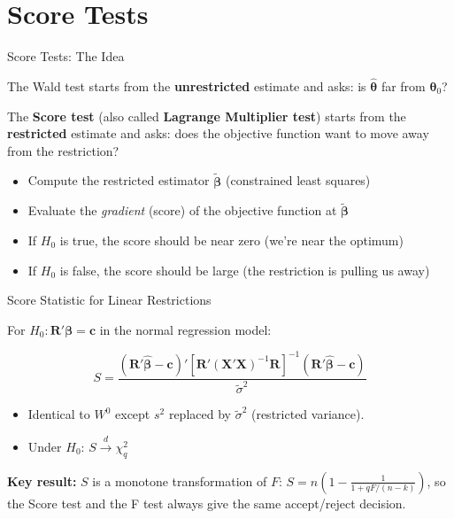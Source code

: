 \documentclass[handout, aspectratio=169]{beamer}
\numberwithin{equation}{section}
\begin{document}
\section{Score Tests}
\setcounter{subsection}{1}

\begin{frame}{Score Tests: The Idea}

The Wald test starts from the \textbf{unrestricted} estimate and asks: is $\hat{\bm{\theta}}$ far from $\bm{\theta}_0$?

\pause
\bigskip

The \textbf{Score test} (also called \textbf{Lagrange Multiplier test}) starts from the \textbf{restricted} estimate and asks: does the objective function want to move away from the restriction?

\pause
\bigskip

\begin{itemize}
\item Compute the restricted estimator $\tilde{\bm{\beta}}$ (constrained least squares)
\item Evaluate the \emph{gradient} (score) of the objective function at $\tilde{\bm{\beta}}$
\item If $H_0$ is true, the score should be near zero (we're near the optimum)
\item If $H_0$ is false, the score should be large (the restriction is pulling us away)
\end{itemize}
\end{frame}

\begin{frame}{Score Statistic for Linear Restrictions}

For $H_0\colon \bm{R}'\bm{\beta} = \bm{c}$ in the normal regression model:

$$S = \frac{(\bm{R}'\hat{\bm{\beta}} - \bm{c})'[\bm{R}'(\bm{X}'\bm{X})^{-1}\bm{R}]^{-1}(\bm{R}'\hat{\bm{\beta}} - \bm{c})}{\tilde{\sigma}^2}$$

\pause

\begin{itemize}
\item Identical to $W^0$ except $s^2$ replaced by $\tilde{\sigma}^2$ (restricted variance).
\item Under $H_0$: $S \xrightarrow{d} \chi^2_q$
\end{itemize}

\pause

\begin{tcolorbox}[colback=blue!5, colframe=blue!50]
\textbf{Key result:} $S$ is a monotone transformation of $F$:
$S = n\left(1 - \frac{1}{1 + qF/(n-k)}\right)$,
so the Score test and the F test always give the same accept/reject decision.
\end{tcolorbox}
\end{frame}
\end{document}
